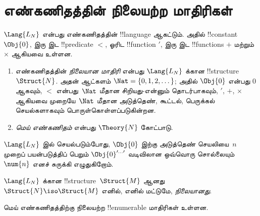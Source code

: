 \documentclass[../../../include/open-logic-section]{subfiles}
\begin{document}
\section{எண்கணிதத்தின் நிலையற்ற மாதிரிகள்}

\begin{defn}
$\Lang{L_N}$ என்பது எண்கணிதத்தின் !!{language} ஆகட்டும். அதில்
!!{constant} $\Obj{0}$, இரு இட !!{predicate} $<$, ஓரிட
!!{function} $\prime$, இரு இட !!{function}s $+$ மற்றும் $\times$
ஆகியவை உள்ளன.
\begin{enumerate}
\item எண்கணிதத்தின் \emph{நிலையான மாதிரி} என்பது $\Lang{L_N}$
  க்கான !!{structure}~$\Struct{N}$. அதன் ஆட்களம்
  $\Nat = \{ 0, 1, 2, \dots\}$; அதில் $\Obj{0}$ என்பது $0$ ஆகவும்,
  $<$ என்பது~$\Nat$ மீதான சிறியது-என்னும் தொடர்பாகவும்,
  $\prime$, $+$, $\times$ ஆகியவை முறையே~$\Nat$ மீதான
  அடுத்தெண், கூட்டல், பெருக்கல் செயல்களாகவும் பொருள்கொள்ளப்படுகின்றன.
\item \emph{மெய் எண்கணிதம்} என்பது $\Theory{N}$ கோட்பாடு.
\end{enumerate}
\end{defn}

$\Lang{L_N}$ இல் செயல்படும்போது, $\Obj{0}$ இற்கு அடுத்தெண்
செயலியை~$n$ முறைப் பயன்படுத்திப் பெறும்
$\Obj{0}^{\prime\dots\prime}$ வடிவிலான ஒவ்வொரு சொல்லையும்
$\num{n}$ எனச் சுருக்கி எழுதுகிறோம்.

\begin{defn}
$\Lang{L_N}$ க்கான !!{structure}~$\Struct{M}$ ஆனது
$\Struct{N} \iso \Struct{M}$ எனில், எனில் மட்டுமே,
\emph{நிலையானது}.
\end{defn}

\begin{thm}
மெய் எண்கணிதத்திற்கு நிலையற்ற !!{enumerable}
மாதிரிகள் உள்ளன.
\end{thm}
\end{document}
